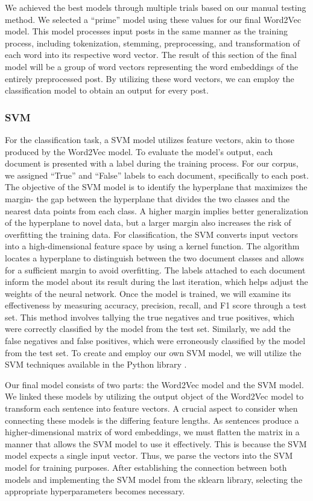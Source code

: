 \documentclass[english,bachelor]{swsLeipzig}
\begin{document}
We achieved the best models through multiple trials based on our manual testing method. We selected a ``prime'' model 
using these values for our final Word2Vec model. This model processes input posts in the same manner as the training process, including tokenization, stemming, preprocessing, and transformation of each word into its respective word vector. The result of this section of the final model will be a group of word vectors representing the word embeddings of the entirely preprocessed post. By utilizing these word vectors, we can employ the classification model to obtain an output for every post.

\subsubsection{SVM}
For the classification task, a SVM model utilizes feature vectors, akin to those produced by the Word2Vec model. To 
evaluate the model's output, each document is presented with a label during the training process. For our corpus, we assigned ``True'' and ``False'' labels to each document, specifically to each post. The objective of the SVM model is to identify the hyperplane that maximizes the margin- the gap between the hyperplane that divides the two classes and the nearest data points from each class. A higher margin implies better generalization of the hyperplane to novel data, but a larger margin also increases the risk of overfitting the training data. For classification, the SVM converts input vectors into a high-dimensional feature space by using a kernel function. The algorithm locates a hyperplane to distinguish between the two document classes and allows for a sufficient margin to avoid overfitting. The labels attached to each document inform the model about its result during the last iteration, which helps adjust the weights of the neural network. Once the model is trained, we will examine its effectiveness by measuring accuracy, precision, recall, and F1 score through a test set. This method involves tallying the true negatives and true positives, which were correctly classified by the model from the test set. Similarly, we add the false negatives and false positives, which were erroneously classified by the model from the test set. To create and employ our own SVM model, we will utilize the SVM techniques available in the Python library \citet{scikit:svm}.

Our final model consists of two parts: the Word2Vec model and the SVM model. We linked these models by utilizing the 
output object of the Word2Vec model to transform each sentence into feature vectors. A crucial aspect to consider when connecting these models is the differing feature lengths. As sentences produce a higher-dimensional matrix of word embeddings, we must flatten the matrix in a manner that allows the SVM model to use it effectively. This is because the SVM model expects a single input vector. Thus, we parse the vectors into the SVM model for training purposes. After establishing the connection between both models and implementing the SVM model from the sklearn library, selecting the appropriate hyperparameters becomes necessary.
\end{document}
